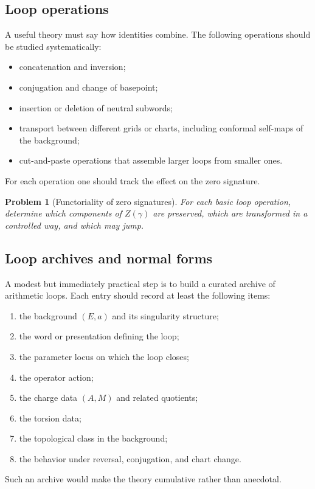 \documentclass[11pt]{article}
\newtheorem{problem}{Problem}[section]
\begin{document}
\subsection{Loop operations}

A useful theory must say how identities combine. The following operations should be studied systematically:
\begin{itemize}
\item concatenation and inversion;
\item conjugation and change of basepoint;
\item insertion or deletion of neutral subwords;
\item transport between different grids or charts, including conformal self-maps of the background;
\item cut-and-paste operations that assemble larger loops from smaller ones.
\end{itemize}
For each operation one should track the effect on the zero signature.

\begin{problem}[Functoriality of zero signatures]
For each basic loop operation, determine which components of $Z(\gamma)$ are preserved, which are transformed in a controlled way, and which may jump.
\end{problem}

\subsection{Loop archives and normal forms}

A modest but immediately practical step is to build a curated archive of arithmetic loops. Each entry should record at least the following items:
\begin{enumerate}[label=(\alph*)]
\item the background $(E,a)$ and its singularity structure;
\item the word or presentation defining the loop;
\item the parameter locus on which the loop closes;
\item the operator action;
\item the charge data $(A,M)$ and related quotients;
\item the torsion data;
\item the topological class in the background;
\item the behavior under reversal, conjugation, and chart change.
\end{enumerate}
Such an archive would make the theory cumulative rather than anecdotal.
\end{document}
